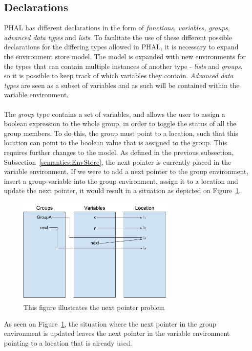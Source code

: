 \subsection*{Declarations}\label{subsec:declarations}
PHAL has different declarations in the form of \textit{functions, variables, groups, advanced data types} and \textit{lists}. 
To facilitate the use of these different possible declarations for the differing types allowed in PHAL, it is necessary to expand the environment store model. 
The model is expanded with new environments for the types that can contain multiple instances of another type - \textit{lists} and \textit{groups}, so it is possible to keep track of which variables they contain. 
\textit{Advanced data types} are seen as a subset of variables and as such will be contained within the variable environment.
\\\\
The \textit{group} type contains a set of variables, and allows the user to assign a boolean expression to the whole group, in order to toggle the status of all the group members. 
To do this, the group must point to a location, such that this location can point to the boolean value that is assigned to the group. 
This requires further changes to the model. As defined in the previous subsection, Subsection~\ref{semantics:EnvStore}, the next pointer is currently placed in the variable environment. 
If we were to add a next pointer to the group environment, insert a group-variable into the group environment, assign it to a location and update the next pointer, it would result in a situation as depicted on Figure~\ref{fig:ESModelProblem}.
\begin{figure}[H]
\centering
  \includegraphics[width=0.7\textwidth]{figures/semantics/5.png}
  \caption{This figure illustrates the next pointer problem}
  \label{fig:ESModelProblem}
\end{figure}
\noindent
As seen on Figure~\ref{fig:ESModelProblem}, the situation where the next pointer in the group environment is updated leaves the next pointer in the variable environment pointing to a location that is already used.
